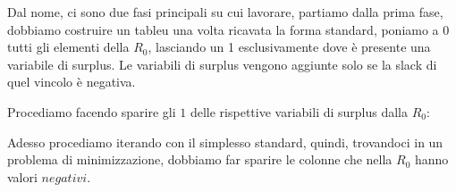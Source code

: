 \documentclass{article}
\begin{document}
Dal nome, ci sono due fasi principali su cui lavorare, partiamo dalla prima fase, dobbiamo costruire un tableu una volta ricavata la forma standard, poniamo a 0 tutti gli elementi della $R_0$, lasciando un 1 esclusivamente dove è presente una variabile di surplus.
Le variabili di surplus vengono aggiunte solo se la slack di quel vincolo è negativa.

\begin{center}
\end{center}

Procediamo facendo sparire gli $1$ delle rispettive variabili di surplus dalla $R_0$:\\

\begin{center}
\end{center}


Adesso procediamo iterando con il simplesso standard, quindi, trovandoci in un problema di minimizzazione, dobbiamo far sparire le colonne che nella $R_0$ hanno valori $negativi$.\\

\begin{center}
\end{center}
\end{document}
